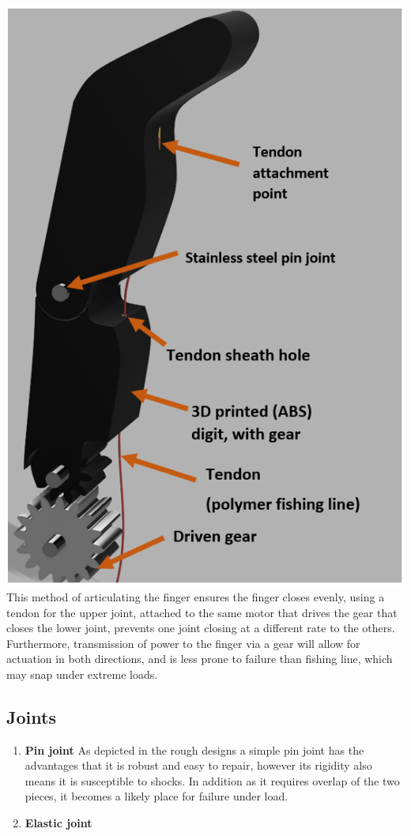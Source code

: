 \documentclass[12pt,3p]{report}
\begin{document}
\begin{multicols}{2}
\begin{enumerate}
{				\includegraphics[scale=0.5]{gear.PNG}
				This method of articulating the finger ensures the finger closes evenly, using a tendon for the upper joint, attached to the same motor that drives the gear that closes the lower joint, prevents one joint closing at a different rate to the others. Furthermore, transmission of power to the finger via a gear will allow for actuation in both directions, and is less prone to failure than fishing line, which may snap under extreme loads.
			}		
			\end{enumerate}
			
		\subsection{Joints}

 \begin{enumerate}
        \item \textbf{Pin joint} {
        As depicted in the rough designs a simple pin joint has the advantages that it is robust and easy to repair, however its rigidity also means it is susceptible to shocks. In addition as it requires overlap of the two pieces, it becomes a likely place for failure under load.
        }
        \item \textbf{Elastic joint} {
        
}
\end{enumerate}
\end{multicols}
\end{document}
